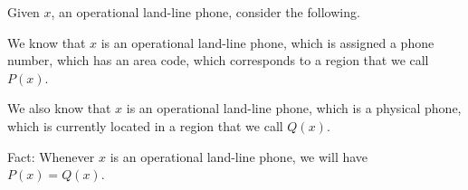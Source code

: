 Given $x$, an operational land-line phone, consider the following.

We know that $x$ is an operational land-line phone, which is assigned
a phone number, which has an area code, which corresponds to a region
that we call $P(x)$.

We also know that $x$ is an operational land-line phone, which is a
physical phone, which is currently located in a region that we call
$Q(x)$.

Fact: Whenever $x$ is an operational land-line phone, we will have
$P(x) = Q(x)$.


